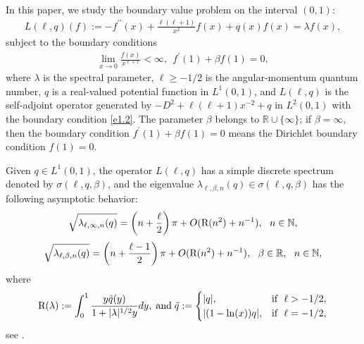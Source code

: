 \documentclass[reqno,12pt,centertags]{amsart}
\renewcommand{\ln}{\text{\rm ln}}
\numberwithin{equation}{section}
\theoremstyle{definition}
\begin{document}
In this paper, we study the boundary value problem on the interval $(0,1)$:
\begin{align}\label{e1.1}
L(\ell, q)(f):=-f^{\prime \prime}(x)+\frac{\ell(\ell+1)}{x^{2}}f(x)+q(x)f(x)
=\lambda f(x),
\end{align}
subject to the boundary conditions
\begin{align}\label{e1.2}
\lim_{x \rightarrow 0}\frac{f(x)}{x^{\ell+1}}<\infty, ~~f^{\prime}(1)+\beta f(1)=0,
\end{align}
where $\lambda$ is the spectral parameter, $\ell \geq-1/2$ is the angular-momentum quantum number, 
$q$ is a real-valued potential function in $L^{1}(0,1)$, 
and $L(\ell, q)$ is the self-adjoint operator generated by $-D^2+\ell(\ell+1)x^{-2}+q$ in $L^{2}(0,1)$ with the boundary condition \eqref{e1.2}.
The parameter $\beta$ belongs to $\mathbb{R} \cup\{\infty\}$;  
if $\beta=\infty$, then the boundary condition $f^{\prime}(1)+\beta f(1)=0$ means the Dirichlet boundary condition $f(1)=0$. 

Given $q\in L^{1}(0, 1)$, the operator $L(\ell, q)$ has a simple discrete spectrum denoted by $\sigma(\ell, q, \beta)$, and the eigenvalue $\lambda_{\ell, \beta, n}(q)\in\sigma(\ell, q, \beta)$ has the following asymptotic behavior:
\begin{equation}\label{e1.3}
\sqrt{\lambda_{\ell, \infty, n}(q)}=\left(n+\frac{\ell}{2}\right) \pi+O(\textnormal{R}(n^{2})+n^{-1}), ~~n \in \mathbb{N},
\end{equation}
\begin{equation}\label{e1.4}
\sqrt{\lambda_{\ell, \beta, n}(q)}=\left(n+\frac{\ell-1}{2}\right) \pi+O(\textnormal{R}(n^{2})+n^{-1}), ~~\beta \in \mathbb{R}, 
~~n \in \mathbb{N},
\end{equation}
where
\begin{equation}\label{e1.7}
\textnormal{R}(\lambda):=\int_0^1 
\frac{y\tilde{q}(y)}{1+|\lambda|^{1/2}y}dy, \;\text{and}\; 
\tilde{q}:=
\begin{cases}
|q|,&\textnormal{if}~~\ell>-1/2,\\
|(1-\ln(x))q|,&\textnormal{if}~~\ell=-1/2,
\end{cases}
\end{equation}
see \cite[Theorem 2.5]{KST2010}.
\end{document}

